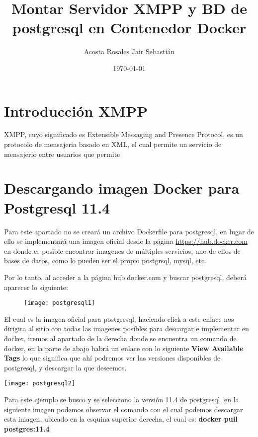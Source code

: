 \documentclass[10pt,letterpaper]{article}
\begin{document}
\title{Montar Servidor XMPP y BD de postgresql en Contenedor Docker}
\author{Acosta Rosales Jair Sebastián}
\date{\today}
\maketitle

\section{Introducción XMPP}
XMPP, cuyo significado es Extensible Messaging and Presence Protocol, es un protocolo de mensajeria basado en XML, el cual permite un servicio de mensajerio entre usuarios que permite 

\section{Descargando imagen Docker para Postgresql 11.4}

Para este apartado no se creará un archivo Dockerfile para postgresql, en lugar de ello se implementará una imagen oficial desde la página \url{https://hub.docker.com} en donde es posible encontrar imagenes de múltiples servicios, uno de ellos de bases de datos, como lo pueden ser el propio postgrsql, mysql, etc.

Por lo tanto, al acceder a la página hub.docker.com y buscar postgresql, deberá aparecer lo siguiente:\\


\begin{figure}[htb]
\centering
\texttt{[image: postgresql1]}
\end{figure}

El cual es la imagen oficial para postgresql, haciendo click a este enlace nos dirigira al sitio con todas las imagenes posibles para descargar e implementar en docker, iremos al apartado de la derecha donde se encuentra un comando de docker, en la parte de abajo habrá un enlace con lo siguiente \textbf{View Available Tags} lo que significa que ahí podremos ver las versiones disponibles de postgresql, y descargar la que deseemos.

\begin{center}
\texttt{[image: postgresql2]}
\end{center}

Para este ejemplo se busco y se selecciono la versión 11.4 de postgresql, en la siguiente imagen podemos observar el comando con el cual podemos descargar esta imagen, ubicado en la esquina superior derecha, el cual es: \textbf{docker pull postgres:11.4}\\
\end{document}
